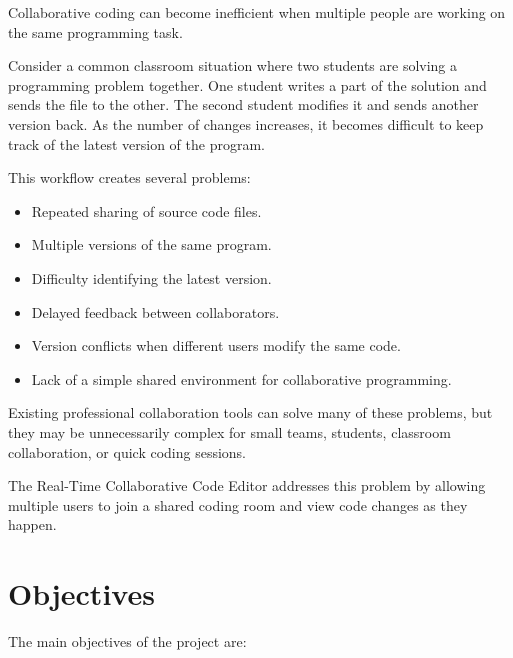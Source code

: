 \documentclass[11pt,letterpaper]{article}
\begin{document}
Collaborative coding can become inefficient when multiple people are working on the same programming task.

Consider a common classroom situation where two students are solving a programming problem together. One student writes a part of the solution and sends the file to the other. The second student modifies it and sends another version back. As the number of changes increases, it becomes difficult to keep track of the latest version of the program.

This workflow creates several problems:

\begin{itemize}
    \item Repeated sharing of source code files.
    \item Multiple versions of the same program.
    \item Difficulty identifying the latest version.
    \item Delayed feedback between collaborators.
    \item Version conflicts when different users modify the same code.
    \item Lack of a simple shared environment for collaborative programming.
\end{itemize}

Existing professional collaboration tools can solve many of these problems, but they may be unnecessarily complex for small teams, students, classroom collaboration, or quick coding sessions.

The Real-Time Collaborative Code Editor addresses this problem by allowing multiple users to join a shared coding room and view code changes as they happen.



\section{Objectives}

The main objectives of the project are:
\end{document}
